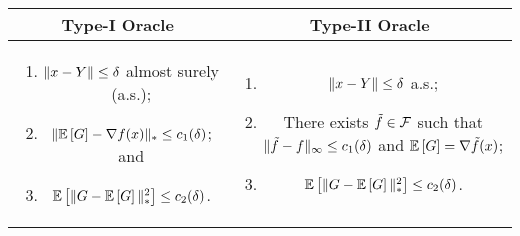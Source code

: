 \begin{tabular}{|c|c|}
\toprule
\begin{minipage}[t]{0.47\textwidth}
\centerline{\textbf{Type-I Oracle}}
\end{minipage}
&
\begin{minipage}[t]{0.47\textwidth}
\centerline{\textbf{Type-II Oracle}}
\end{minipage}
\\\midrule
\begin{minipage}[t]{0.47\textwidth}
\begin{enumerate}
\item $\|x-Y\|\le \delta$ almost surely (a.s.);
\item $\| \mathbb{E}\left[G\right]  - \nabla f(x)  \|_* \le c_1(\delta) $; and
\item $\mathbb{E}\left[\| G -  \mathbb{E}\left[G\right] \|_*^2\right] \le c_2(\delta)$.
\end{enumerate}
\end{minipage}
&
\begin{minipage}[t]{0.47\textwidth}
\begin{enumerate}
\item $\|x-Y\|\le \delta$ a.s.;
\item There exists $\tilde{f} \in \mathcal{F}$ such that
$\|\tilde{f}- f\|_\infty \le c_1(\delta)$  and
$\mathbb{E}\left[G\right]  = \nabla \tilde{f}(x)$;
\item $\mathbb{E}\left[\| G -  \mathbb{E}\left[G\right] \|_*^2\right] \le c_2(\delta)$.
\end{enumerate}
\end{minipage}
\\\bottomrule
\end{tabular}

